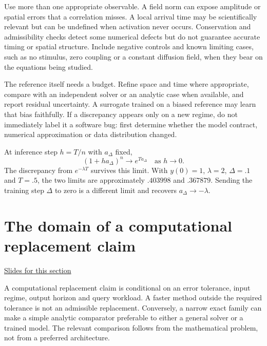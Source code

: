 \documentclass[11pt,letterpaper]{article}
\theoremstyle{definition}\newtheorem{definition}{Definition}\newtheorem{example}{Example}
\numberwithin{equation}{section}
\begin{document}
Use more than one appropriate observable. A field norm can expose amplitude or spatial errors that a correlation misses. A local arrival time may be scientifically relevant but can be undefined when activation never occurs. Conservation and admissibility checks detect some numerical defects but do not guarantee accurate timing or spatial structure. Include negative controls and known limiting cases, such as no stimulus, zero coupling or a constant diffusion field, when they bear on the equations being studied.

The reference itself needs a budget. Refine space and time where appropriate, compare with an independent solver or an analytic case when available, and report residual uncertainty. A surrogate trained on a biased reference may learn that bias faithfully. If a discrepancy appears only on a new regime, do not immediately label it a software bug: first determine whether the model contract, numerical approximation or data distribution changed.

At inference step $h=T/n$ with $a_\Delta$ fixed,
\[
 (1+ha_\Delta)^n\longrightarrow e^{Ta_\Delta}
 \quad\text{as }h\to0.
\]
The discrepancy from $e^{-\lambda T}$ survives this limit. With $y(0)=1$, $\lambda=2$, $\Delta=.1$ and $T=.5$, the two limits are approximately $.403998$ and $.367879$. Sending the training step $\Delta$ to zero is a different limit and recovers $a_\Delta\to-\lambda$.
\section{The domain of a computational replacement claim}
\hypertarget{note-the-domain-of-a-computational-replacement-claim}{}\label{note:the-domain-of-a-computational-replacement-claim}
{\small \href{slides.html\#frame=an-admissible-computational-replacement\&step=1}{Slides for this section}}\par


A computational replacement claim is conditional on an error tolerance, input regime, output horizon and query workload. A faster method outside the required tolerance is not an admissible replacement. Conversely, a narrow exact family can make a simple analytic comparator preferable to either a general solver or a trained model. The relevant comparison follows from the mathematical problem, not from a preferred architecture.
\bigskip
\end{document}
